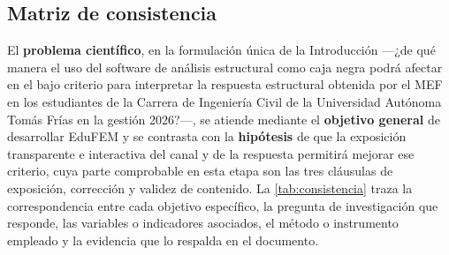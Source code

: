 \subsection{Matriz de consistencia}
\label{sec:matriz-consistencia}

El \textbf{problema científico}, en la formulación única de la Introducción —¿de qué manera el uso del software de análisis estructural como caja negra podrá afectar en el bajo criterio para interpretar la respuesta estructural obtenida por el MEF en los estudiantes de la Carrera de Ingeniería Civil de la Universidad Autónoma Tomás Frías en la gestión 2026?—, se atiende mediante el \textbf{objetivo general} de desarrollar EduFEM y se contrasta con la \textbf{hipótesis} de que la exposición transparente e interactiva del canal y de la respuesta permitirá mejorar ese criterio, cuya parte comprobable en esta etapa son las tres cláusulas de exposición, corrección y validez de contenido. La \autoref{tab:consistencia} traza la correspondencia entre cada objetivo específico, la pregunta de investigación que responde, las variables o indicadores asociados, el método o instrumento empleado y la evidencia que lo respalda en el documento.


